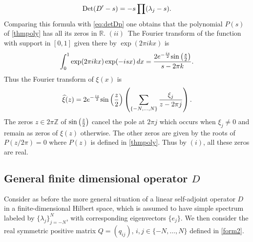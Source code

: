 \documentclass{amsart}
\def\R{{\mathbb R}}
\def\Z{{\mathbb Z}}
\def\sin{{{\rm sin}}}
\def\R{{\mathbb R}}
\def\Z{{\mathbb Z}}
\def\sin{{{\rm sin}}}
\begin{document}
 $$
 {\rm Det}(D'-s)=-s\prod (\lambda_j-s).
 $$
	Comparing this formula with \eqref{eq:detDp} one obtains that the polynomial $P(s)$ of \eqref{thmpoly} has all its zeros in $\R$.\newline
	$(ii)$~The Fourier transform of the function with support in $[0,1]$ given there by $\exp(2\pi ikx)$ is 
	$$
	\int_0^1 \exp (2 \pi  i k x) \exp (-i s x) \, dx=\frac{2 e^{-\frac{is}{2} } \sin \left(\frac{s}{2}\right)}{s-2 \pi  k}.
	$$
	Thus the  Fourier transform of $\xi(x)$ is 
	$$
	\widehat\xi(z)=2 e^{-\frac{iz}{2} } \sin \left(\frac{z}{2}\right)\left(\sum_{\{-N,\ldots,N\}} \frac{\xi_j}{z-2\pi j}\right).
	$$
	The zeros $z\in 2\pi \Z$ of $\sin \left(\frac{z}{2}\right)$ cancel the pole at $2\pi j$ which occurs when $\xi_j\neq 0$ and remain as zeros of $\widehat\xi(z)$ otherwise. The other zeros are given by the roots of $P(z/2 \pi)=0$ where $P(z)$ is defined in \eqref{thmpoly}. Thus by $(i)$, all these zeros are real. \endproof 
	\endproof

\subsection{General finite dimensional operator $D$}
Consider as before the more general situation of a linear self-adjoint operator $D$ in a finite-dimensional Hilbert space, which is assumed to have simple spectrum labeled by $\{ \lambda_j\}_{j=-N}^N$, with corresponding eigenvectors $\{e_j\}$. We then consider the real symmetric positive matrix $Q=(q_{ij})$, $i,j\in \{-N,\ldots,N\}$ defined in \eqref{form2}. 
\end{document}
